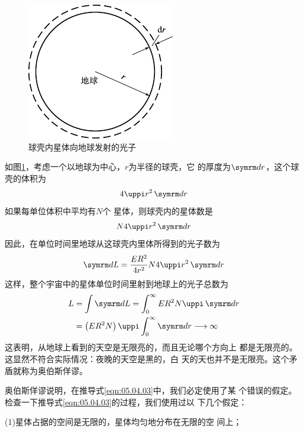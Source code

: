 \begin{figure}
  \centering
  \vspace{-2.5em}
  \includegraphics{figure/fig05.03}
  \caption{球壳内星体向地球发射的光子}
  \label{fig:05.03}
\end{figure}
如图\ref{fig:05.03}，考虑一个以地球为中心，$ r $为半径的球壳，它
的厚度为$ \dif r $，这个球壳的体积为
\begin{equation*}
  4 \uppi r ^ { 2 } \dif r
\end{equation*}%
如果每单位体积中平均有$ N $个
星体，则球壳内的星体数是
\begin{equation}\label{eqn:05.04.02}
  N  4  \uppi r ^ { 2 } \dif r
\end{equation}
因此，在单位时间里地球从这球壳内里体所得到的光子数为
\begin{equation*}
  \dif L = \frac { E R ^ { 2 } } { 4 r ^ { 2 } } N 4 \uppi r ^ { 2 } \dif r
\end{equation*}
这样，整个宇宙中的星体单位时间里射到地球上的光子总数为
\begin{equation}\label{eqn:05.04.03}
  \begin{aligned}
    L & = \int \dif L = \int _ 0 ^ { \infty } { E R ^ { 2 } N \uppi \dif r }                     \\
      & = \left( E R ^ { 2 } N \right) \uppi \int _ 0 ^ { \infty } \dif r \longrightarrow \infty
  \end{aligned}
\end{equation}
这表明，从地球上看到的天空是无限亮的，而且无论哪个方向上
都是无限亮的。这显然不符合实际情况：夜晚的天空是黑的，白
天的天也并不是无限亮。这个矛盾就称为奥伯斯佯谬。

奥伯斯佯谬说明，在推导式\eqref{eqn:05.04.03}中，我们必定使用了某
个错误的假定。检查一下推导式\eqref{eqn:05.04.03}的过程，我们使用过以
下几个假定：

(1)星体占据的空间是无限的，星体均匀地分布在无限的空
间上；


